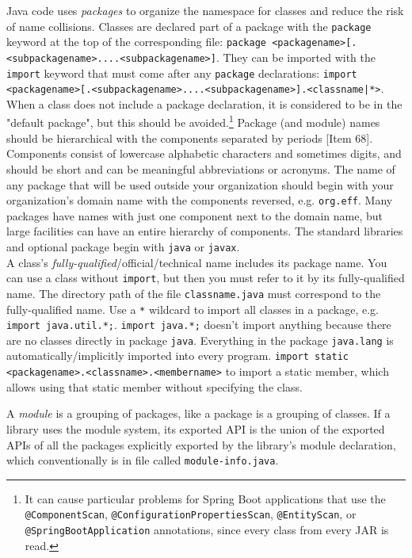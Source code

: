 \documentclass[8pt, table, xcdraw]{article}%
\begin{document}
Java code uses \emph{packages} to organize the namespace for classes and reduce the risk of name collisions. Classes are declared part of a package with the \lstinline{package} keyword at the top of the corresponding file: \lstinline{package <packagename>[.<subpackagename>....<subpackagename>]}. They can be imported with the \lstinline{import} keyword that must come after any \lstinline{package} declarations: \lstinline{import <packagename>[.<subpackagename>....<subpackagename>].<classname|*>}. When a class does not include a package declaration, it is considered to be in the "default package", but this should be avoided.\footnote{It can cause particular problems for Spring Boot applications that use the \lstinline{@ComponentScan}, \lstinline{@ConfigurationPropertiesScan}, \lstinline{@EntityScan}, or \lstinline{@SpringBootApplication} annotations, since every class from every JAR is read.} Package (and module) names should be hierarchical with the components separated by periods [Item 68]. Components consist of lowercase alphabetic characters and sometimes digits, and should be short and can be meaningful abbreviations or acronyms. The name of any package that will be used outside your organization should begin with your organization’s domain name with the components reversed, e.g. \lstinline{org.eff}. Many packages have names with just one component next to the domain name, but large facilities can have an entire hierarchy of components. The standard libraries and optional package begin with \lstinline{java} or \lstinline{javax}.\\
A class's \emph{fully-qualified}/official/technical name includes its package name. You can use a class without \lstinline{import}, but then you must refer to it by its fully-qualified name. The directory path of the file \lstinline{classname.java} must correspond to the fully-qualified name. Use a \lstinline{*} wildcard to import all classes in a package, e.g. \lstinline{import java.util.*;}. \lstinline{import java.*;} doesn't import anything because there are no classes directly in package \lstinline{java}. Everything in the package \lstinline{java.lang} is automatically/implicitly imported into every program. \lstinline{import static <packagename>.<classname>.<membername>} to import a static member, which allows using that static member without specifying the class.

A \emph{module} is a grouping of packages, like a package is a grouping of classes. If a library uses the module system, its exported API is the union of the exported APIs of all the packages explicitly exported by the library’s module declaration, which conventionally is in file called \lstinline{module-info.java}. 
\end{document}
